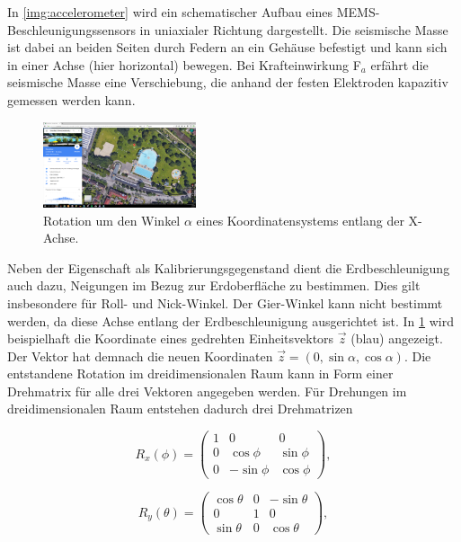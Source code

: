 	In \ref{img:accelerometer} wird ein schematischer Aufbau eines MEMS-Beschleunigungssensors in uniaxialer Richtung dargestellt. Die seismische Masse ist dabei an beiden Seiten durch Federn an ein Gehäuse befestigt und kann sich in einer Achse (hier horizontal) bewegen. Bei Krafteinwirkung F$_a$ erfährt die seismische Masse eine Verschiebung, die anhand der festen Elektroden kapazitiv gemessen werden kann\cite{sensortechnik}.
	
 	\begin{figure}[h]
		\centering
		\includegraphics[width=0.4\textwidth]{images/koordinatensystem.pdf}
		\caption[Rotationen um eine Achse]{Rotation um den Winkel $\alpha$ eines Koordinatensystems entlang der X-Achse.}
		\label{img:koordinatensystem}
	\end{figure}
	
	Neben der Eigenschaft als Kalibrierungsgegenstand dient die Erdbeschleunigung auch dazu, Neigungen im Bezug zur Erdoberfläche zu bestimmen. Dies gilt insbesondere für Roll- und Nick-Winkel. Der Gier-Winkel kann nicht bestimmt werden, da diese Achse entlang der Erdbeschleunigung ausgerichtet ist. In \ref{img:koordinatensystem} wird beispielhaft die Koordinate eines gedrehten Einheitsvektors $\Vec{z}$ (blau) angezeigt. Der Vektor hat demnach die neuen Koordinaten $\Vec{z} = (0, \sin{\alpha}, \cos{\alpha})$. Die entstandene Rotation im dreidimensionalen Raum kann in Form einer Drehmatrix für alle drei Vektoren angegeben werden. Für Drehungen im dreidimensionalen Raum entstehen dadurch drei Drehmatrizen\cite{rui-zhang}
	
	\begin{equation}
		R_x(\phi) = 
		\begin{pmatrix}
			1 & 0 & 0\\
			0 & \cos{\phi} & \sin{\phi}\\
			0 & -\sin{\phi} & \cos{\phi}
		\end{pmatrix},
		\label{eqn:drehmatrix-x}
	\end{equation}
	
	\begin{equation}
		R_y(\theta) = 
		\begin{pmatrix}
			\cos{\theta} & 0 & -\sin{\theta}\\
			0 & 1 & 0\\
			\sin{\theta} & 0 & \cos{\theta}
		\end{pmatrix},
		\label{eqn:drehmatrix-y}
	\end{equation}
	
